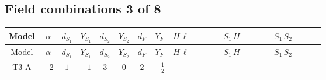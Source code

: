 \documentclass[8pt]{article}
\begin{document}
\begin{landscape}
\subsection*{Field combinations 3 of 8}
\begin{longtable}{@{}cccccccc >{\raggedright\arraybackslash}p{0.21\linewidth} >{\raggedright\arraybackslash}p{0.21\linewidth} >{\raggedright\arraybackslash}p{0.21\linewidth}@{}}
\toprule
Model & $\alpha$ & $d_{S_1}$ & $Y_{S_1}$ & $d_{S_2}$ & $Y_{S_2}$ & $d_F$ & $Y_F$ & $H\,\ell$ & $S_1\,H$ & $S_1\,S_2$ \\
\midrule
\endfirsthead
\toprule
Model & $\alpha$ & $d_{S_1}$ & $Y_{S_1}$ & $d_{S_2}$ & $Y_{S_2}$ & $d_F$ & $Y_F$ & $H\,\ell$ & $S_1\,H$ & $S_1\,S_2$ \\
\midrule
\endhead
T3-A & $-2$ & $1$ & $-1$ & $3$ & $0$ & $2$ & $-\frac{1}{2}$ & \scriptsize\adjustbox{max width=\linewidth}{$\begin{gathered} +\frac{2 \hbar  \overline{y_{1,i_1,r_1}} \overline{y_{2,i_2,r_1}} L_{a_4,i_2}{}^T\, C\, P_L\, L_{a_2,i_1} H_{a_1} H_{a_3} \lambda_5 \epsilon_{a_1,a_2} \epsilon_{a_3,a_4}}{\sqrt{3} \epsilon  M_F} \\ +\frac{2 \hbar  \overline{y_{1,i_1,r_1}} \overline{y_{2,i_2,r_1}} L_{a_4,i_2}{}^T\, C\, P_L\, L_{a_2,i_1} H_{a_1} H_{a_3} \lambda_5 \epsilon_{a_1,a_2} \epsilon_{a_3,a_4}}{\sqrt{3} M_F} \\ +\frac{2 \hbar  \overline{\lambda_5} \overline{L_{a_3,i_1}}\, C\, P_R\, \overline{L_{a_4,i_2}}{}^T y_{1,i_1,r_1} y_{2,i_2,r_1} \epsilon_{a_1,a_3} \epsilon_{a_2,a_4} H_{a_1}{}^{\dagger } H_{a_2}{}^{\dagger }}{\sqrt{3} \epsilon  M_F}\end{gathered}$} & \scriptsize\adjustbox{max width=\linewidth}{$\begin{gathered} -\frac{2 \hbar  \overline{y_{1,i_1,r_1}} \overline{Y_{e,i_2,i_3}} H_{a_1} S_1 y_{1,i_2,r_1} Y_{e,i_1,i_3} H_{a_1}{}^{\dagger } S_1{}^{\dagger }}{\epsilon } \\ -2 \hbar  \overline{y_{1,i_1,r_1}} \overline{Y_{e,i_2,i_3}} H_{a_1} S_1 y_{1,i_2,r_1} Y_{e,i_1,i_3} H_{a_1}{}^{\dagger } S_1{}^{\dagger } \\ +H_{a_2} S_1 H_{a_1}{}^{\dagger } S_1{}^{\dagger } \mathcal{I}_{H1,a_1,a_2}{}^1 \lambda_{HS_1}^{(1)}^{(1)}\end{gathered}$} & \scriptsize\adjustbox{max width=\linewidth}{$\begin{gathered} -\frac{4 \hbar  \overline{y_{1,i_1,r_1}} \overline{y_{2,i_2,r_2}} S_1 S_{2,j_1} y_{1,i_2,r_1} y_{2,i_1,r_2} S_1{}^{\dagger } S_{2,j_1}{}^{\dagger }}{\sqrt{3} \epsilon } \\ +\frac{4 \hbar  \overline{y_{1,i_1,r_1}} \overline{y_{2,i_2,r_1}} S_1 S_{2,j_1} y_{1,i_2,r_2} y_{2,i_1,r_2} S_1{}^{\dagger } S_{2,j_1}{}^{\dagger }}{\sqrt{3}} \\ +\frac{4 \hbar  \overline{y_{1,i_1,r_1}} \overline{y_{2,i_2,r_1}} S_1 S_{2,j_1} y_{1,i_1,r_2} y_{2,i_2,r_2} S_1{}^{\dagger } S_{2,j_1}{}^{\dagger }}{\sqrt{3}}\end{gathered}$} \\

\end{longtable}
\end{landscape}
\end{document}
